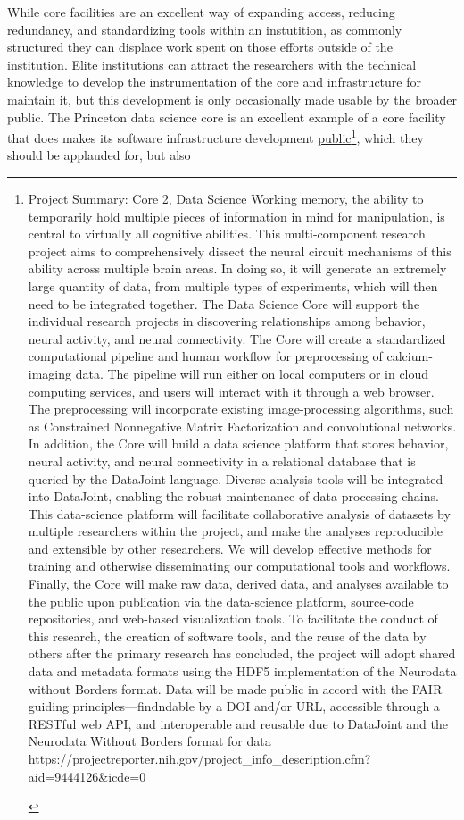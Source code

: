 \documentclass{article}
\begin{document}
While core facilities are an excellent way of expanding access, reducing
redundancy, and standardizing tools within an instutition, as commonly
structured they can displace work spent on those efforts outside of the
institution. Elite institutions can attract the researchers with the
technical knowledge to develop the instrumentation of the core and
infrastructure for maintain it, but this development is only
occasionally made usable by the broader public. The Princeton data
science core is an excellent example of a core facility that does makes
its software infrastructure development
\href{https://github.com/BrainCOGS}{public}\footnote{\begin{leftbar}
  Project Summary: Core 2, Data Science Working memory, the ability to
  temporarily hold multiple pieces of information in mind for
  manipulation, is central to virtually all cognitive abilities. This
  multi-component research project aims to comprehensively dissect the
  neural circuit mechanisms of this ability across multiple brain areas.
  In doing so, it will generate an extremely large quantity of data,
  from multiple types of experiments, which will then need to be
  integrated together. The Data Science Core will support the individual
  research projects in discovering relationships among behavior, neural
  activity, and neural connectivity. The Core will create a standardized
  computational pipeline and human workflow for preprocessing of
  calcium-imaging data. The pipeline will run either on local computers
  or in cloud computing services, and users will interact with it
  through a web browser. The preprocessing will incorporate existing
  image-processing algorithms, such as Constrained Nonnegative Matrix
  Factorization and convolutional networks. In addition, the Core will
  build a data science platform that stores behavior, neural activity,
  and neural connectivity in a relational database that is queried by
  the DataJoint language. Diverse analysis tools will be integrated into
  DataJoint, enabling the robust maintenance of data-processing chains.
  This data-science platform will facilitate collaborative analysis of
  datasets by multiple researchers within the project, and make the
  analyses reproducible and extensible by other researchers. We will
  develop effective methods for training and otherwise disseminating our
  computational tools and workflows. Finally, the Core will make raw
  data, derived data, and analyses available to the public upon
  publication via the data-science platform, source-code repositories,
  and web-based visualization tools. To facilitate the conduct of this
  research, the creation of software tools, and the reuse of the data by
  others after the primary research has concluded, the project will
  adopt shared data and metadata formats using the HDF5 implementation
  of the Neurodata without Borders format. Data will be made public in
  accord with the FAIR guiding principles---findndable by a DOI and/or
  URL, accessible through a RESTful web API, and interoperable and
  reusable due to DataJoint and the Neurodata Without Borders format for
  data
  https://projectreporter.nih.gov/project\_info\_description.cfm?aid=9444126\&icde=0
  \end{leftbar}}, which they should be applauded for, but also
\end{document}
